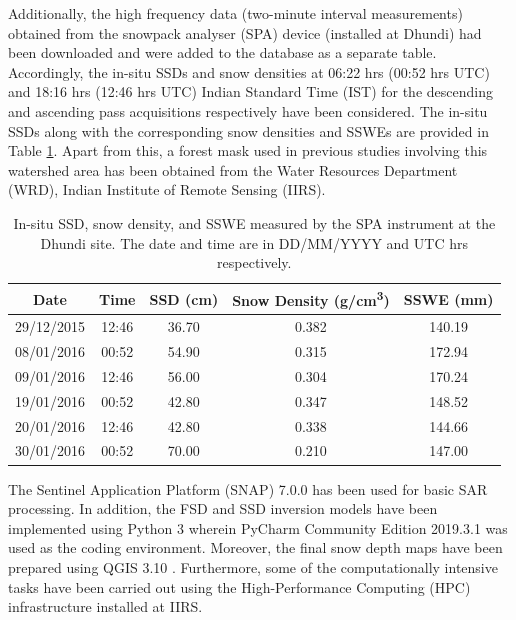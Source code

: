\documentclass[12pt]{elsarticle}
\numberwithin{equation}{section}
\numberwithin{figure}{section}
\numberwithin{table}{section}
\begin{document}
Additionally, the high frequency data (two-minute interval measurements) obtained from the snowpack analyser (SPA) device (installed at Dhundi) had been downloaded and were added to the database as a separate table. Accordingly, the in-situ SSDs and snow densities at 06:22 hrs (00:52 hrs UTC) and 18:16 hrs (12:46 hrs UTC) Indian Standard Time (IST) for the descending and ascending pass acquisitions respectively have been considered. The in-situ SSDs along with the corresponding snow densities and SSWEs are provided in Table \ref{table:ssd_data}. Apart from this, a forest mask used in previous studies involving this watershed area \citep{Thakur2012, Thakur2017} has been obtained from the Water Resources Department (WRD), Indian Institute of Remote Sensing (IIRS).

\begin{table}[htb]
\centering
\caption{In-situ SSD, snow density, and SSWE measured by the SPA instrument at the Dhundi site. The date and time are in DD/MM/YYYY and UTC hrs respectively.}
\label{table:ssd_data}
\begin{tabular}{c c c c c}
\hline
\textbf{Date}    & \textbf{Time}   & \textbf{SSD (cm)}   & \textbf{Snow Density (g/cm\textsuperscript{3})} & \textbf{SSWE (mm)}  \\ \hline
29/12/2015  & 12:46 & 36.70  & 0.382    & 140.19    \\ 
08/01/2016  & 00:52 & 54.90  & 0.315    & 172.94    \\ 
09/01/2016  & 12:46 & 56.00  & 0.304    & 170.24    \\ 
19/01/2016  & 00:52 & 42.80  & 0.347    & 148.52    \\ 
20/01/2016  & 12:46 & 42.80  & 0.338    & 144.66    \\ 
30/01/2016  & 00:52 & 70.00  & 0.210    & 147.00    \\ \hline
\end{tabular}
\end{table}

The Sentinel Application Platform (SNAP) 7.0.0 \citep{ESA2019} has been used for basic SAR processing. In addition, the FSD and SSD inversion models have been implemented using Python 3 wherein PyCharm Community Edition 2019.3.1 \citep{JetBrains2019} was used as the coding environment. Moreover, the final snow depth maps have been prepared using QGIS 3.10 \citep{QGISDevelopmentTeam2019}. Furthermore, some of the computationally intensive tasks have been carried out using the High-Performance Computing (HPC) infrastructure installed at IIRS.
\FloatBarrier
\end{document}

